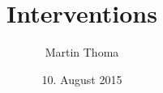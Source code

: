 \documentclass{beamer}
\begin{document}
\title{Interventions}
\author{Martin Thoma}
\date{10. August 2015}
\subject{Causality}

\frame{\titlepage}






\end{document}
